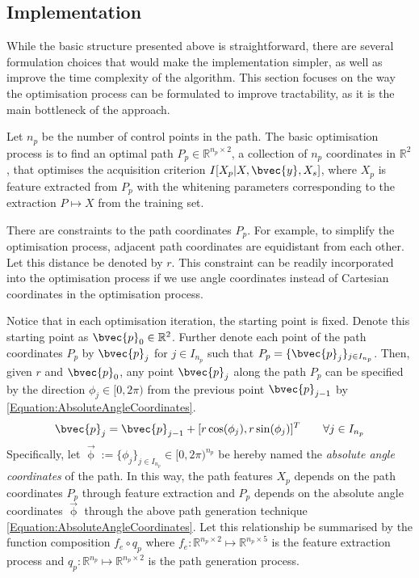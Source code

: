 		\subsection{Implementation}

			While the basic structure presented above is straightforward, there are several formulation choices that would make the implementation simpler, as well as improve the time complexity of the algorithm. This section focuses on the way the optimisation process can be formulated to improve tractability, as it is the main bottleneck of the approach.
			
%			
%			
%			
	
			Let $n_{p}$ be the number of control points in the path. The basic optimisation process is to find an optimal path $P_{p} \in \mathbb{R}^{n_{p} \times 2}$, a collection of $n_{p}$ coordinates in $\mathbb{R}^{2}$, that optimises the acquisition criterion $I[X_{p} | X, \bvec{y}, X_{s}]$, where $X_{p}$ is feature extracted from $P_{p}$ with the whitening parameters corresponding to the extraction $P \mapsto X$ from the training set.
			
			There are constraints to the path coordinates $P_{p}$. For example, to simplify the optimisation process, adjacent path coordinates are equidistant from each other. Let this distance be denoted by $r$. This constraint can be readily incorporated into the optimisation process if we use angle coordinates instead of Cartesian coordinates in the optimisation process.
			
			Notice that in each optimisation iteration, the starting point is fixed. Denote this starting point as $\bvec{p}_{0} \in \mathbb{R}^{2}$. Further denote each point of the path coordinates $P_{p}$ by $\bvec{p}_{j}$ for $j \in I_{n_{p}}$ such that $P_{p} = \{\bvec{p}_{j}\}_{j \in I_{n_{p}}}$. Then, given $r$ and $\bvec{p}_{0}$, any point $\bvec{p}_{j}$ along the path $P_{p}$ can be specified by the direction $\phi_{j} \in [0, 2 \pi)$ from the previous point $\bvec{p}_{j - 1}$ by \eqref{Equation:AbsoluteAngleCoordinates}. \begin{equation}			
				\bvec{p}_{j} = \bvec{p}_{j - 1} + [r \cos(\phi_{j}), r \sin(\phi_{j})]^{T}	\qquad \forall j \in I_{n_{p}}			
			\label{Equation:AbsoluteAngleCoordinates}			
			\end{equation} Specifically, let $\vec{\upphi} := \{\phi_{j}\}_{j \in I_{n_{p}}} \in [0, 2 \pi)^{n_{p}}$ be hereby named the \textit{absolute angle coordinates} of the path. In this way, the path features $X_{p}$ depends on the path coordinates $P_{p}$ through feature extraction and $P_{p}$ depends on the absolute angle coordinates $\vec{\upphi}$ through the above path generation technique \eqref{Equation:AbsoluteAngleCoordinates}. Let this relationship be summarised by the function composition $f_{e} \circ q_{p}$ where $f_{e}: \mathbb{R}^{n_{p} \times 2} \mapsto \mathbb{R}^{n_{p} \times 5}$ is the feature extraction process and $q_{p}: \mathbb{R}^{n_{p}} \mapsto \mathbb{R}^{n_{p} \times 2}$ is the path generation process.
			
